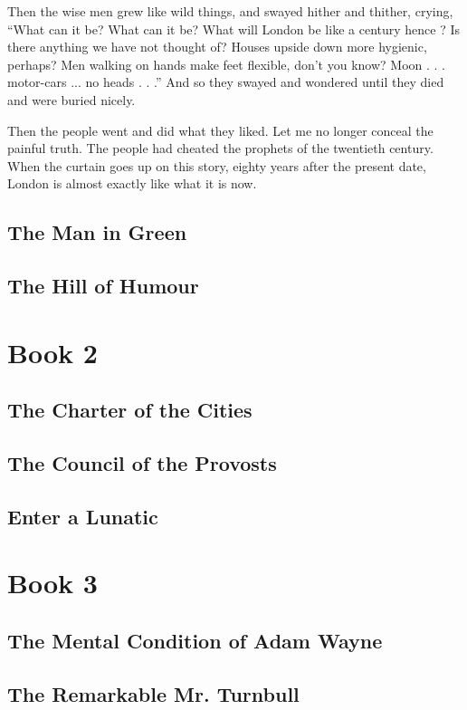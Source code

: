 \documentclass{book}
\begin{document}
Then the wise men grew like wild things, and swayed hither and thither, crying, “What can it be? What can it be? What will London be like a century hence ? Is there anything we have not thought of? Houses upside down more hygienic, perhaps? Men walking on hands make feet flexible, don’t you know? Moon . . . motor-cars ... no heads . . .” And so they swayed and wondered until they died and were buried nicely.

Then the people went and did what they liked. Let me no longer conceal the painful truth. The people had cheated the prophets of the twentieth century. When the curtain goes up on this story, eighty years after the present date, London is almost exactly like what it is now.

\chapter{The Man in Green}
\label{chapter-2}
\chapter{The Hill of Humour}
\label{chapter-3}
\setcounter{chapter}{0}\part*{Book 2}
\label{chapter-4}
\chapter{The Charter of the Cities}
\label{chapter-5}
\chapter{The Council of the Provosts}
\label{chapter-6}
\chapter{Enter a Lunatic}
\label{chapter-7}
\setcounter{chapter}{0}\part*{Book 3}
\label{chapter-8}
\chapter{The Mental Condition of Adam Wayne}
\label{chapter-9}
\chapter{The Remarkable Mr. Turnbull}
\label{chapter-10}
\end{document}
